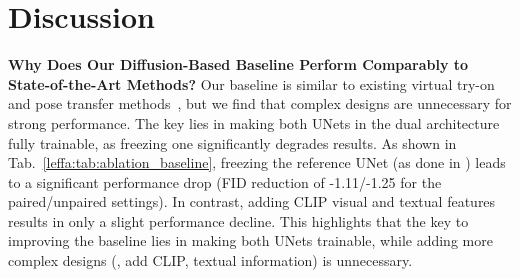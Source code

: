 \section{Discussion}
\label{leffa:sec:discussion}

\noindent \textbf{Why Does Our Diffusion-Based Baseline Perform Comparably to State-of-the-Art Methods?}
Our baseline is similar to existing virtual try-on and pose transfer methods~\citep{choi2024improving, xu2024ootdiffusion, bhunia2023person, han2023controllable}, but we find that complex designs are unnecessary for strong performance.
The key lies in making both UNets in the dual architecture fully trainable, as freezing one significantly degrades results.
As shown in Tab.~\ref{leffa:tab:ablation_baseline}, freezing the reference UNet (as done in \citet{choi2024improving}) leads to a significant performance drop (FID reduction of -1.11/-1.25 for the paired/unpaired settings).
In contrast, adding CLIP visual and textual features~\citep{choi2024improving, xu2024ootdiffusion} results in only a slight performance decline.
This highlights that the key to improving the baseline lies in making both UNets trainable, while adding more complex designs (\eg, add CLIP, textual information) is unnecessary.


\begin{table}[!t]
\centering
\setlength{\tabcolsep}{0.2cm}
\caption{Ablation study for our diffusion-based baseline.
Making both the generative and reference UNets trainable is key to performance improvement for our diffusion-based baseline.
}
\label{leffa:tab:ablation_baseline}
\end{table}



